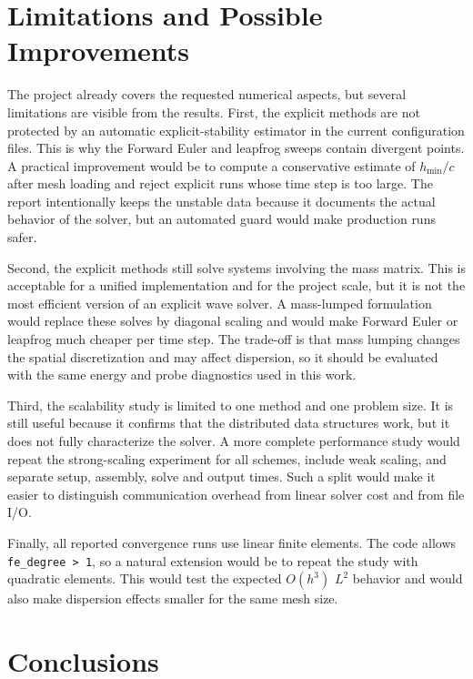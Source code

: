 \documentclass[11pt,a4paper]{article}
\begin{document}
\section{Limitations and Possible Improvements}

The project already covers the requested numerical aspects, but several
limitations are visible from the results.  First, the explicit methods are not
protected by an automatic explicit-stability estimator in the current configuration files.
This is why the Forward Euler and leapfrog sweeps contain divergent points.  A
practical improvement would be to compute a conservative estimate of
$h_{\min}/c$ after mesh loading and reject explicit runs whose time step is too
large.  The report intentionally keeps the unstable data because it documents
the actual behavior of the solver, but an automated guard would make production
runs safer.

Second, the explicit methods still solve systems involving the mass matrix.
This is acceptable for a unified implementation and for the project scale, but
it is not the most efficient version of an explicit wave solver.  A mass-lumped
formulation would replace these solves by diagonal scaling and would make
Forward Euler or leapfrog much cheaper per time step.  The trade-off is that
mass lumping changes the spatial discretization and may affect dispersion, so it
should be evaluated with the same energy and probe diagnostics used in this
work.

Third, the scalability study is limited to one method and one problem size.  It
is still useful because it confirms that the distributed data structures work,
but it does not fully characterize the solver.  A more complete performance
study would repeat the strong-scaling experiment for all schemes, include weak
scaling, and separate setup, assembly, solve and output times.  Such a split
would make it easier to distinguish communication overhead from linear solver
cost and from file I/O.

Finally, all reported convergence runs use linear finite elements.  The code
allows \texttt{fe\_degree > 1}, so a natural extension would be to repeat the
study with quadratic elements.  This would test the expected $O(h^3)$ $L^2$
behavior and would also make dispersion effects smaller for the same mesh size.

\section{Conclusions}
\end{document}
